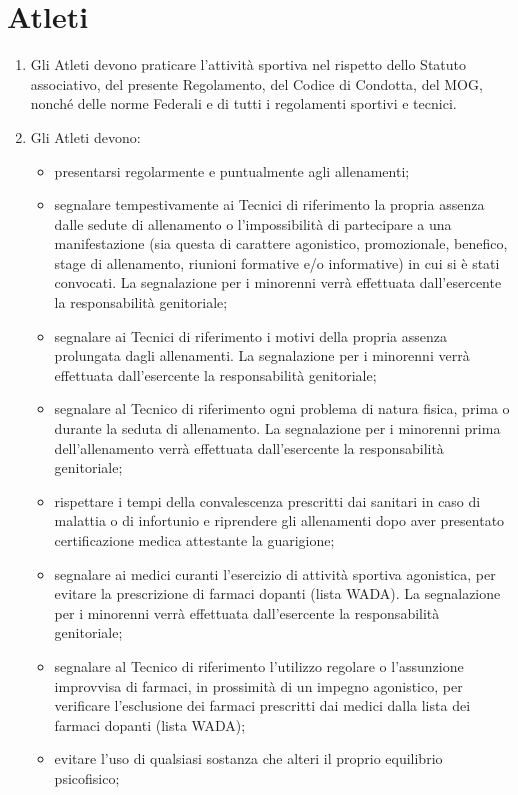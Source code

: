 \documentclass{djtsdoc}
\begin{document}
	\section{Atleti}
	\begin{enumerate}
		\item Gli Atleti devono praticare l'attività sportiva nel rispetto dello Statuto associativo, del presente Regolamento, del Codice di Condotta, del MOG, nonché delle norme Federali e di tutti i regolamenti sportivi e tecnici.
		\item Gli Atleti devono:
		\begin{itemize}
			\item presentarsi regolarmente e puntualmente agli allenamenti;
			\item segnalare tempestivamente ai Tecnici di riferimento la propria assenza dalle sedute di allenamento o l'impossibilità di partecipare a una manifestazione (sia questa di carattere agonistico, promozionale, benefico, stage di allenamento, riunioni formative e/o informative) in cui si è stati convocati. La segnalazione per i minorenni verrà effettuata dall'esercente la responsabilità genitoriale;
			\item segnalare ai Tecnici di riferimento i motivi della propria assenza prolungata dagli allenamenti. La segnalazione per i minorenni verrà effettuata dall'esercente la responsabilità genitoriale;
			\item segnalare al Tecnico di riferimento ogni problema di natura fisica, prima o durante la seduta di allenamento. La segnalazione per i minorenni prima dell'allenamento verrà effettuata dall'esercente la responsabilità genitoriale;
			\item rispettare i tempi della convalescenza prescritti dai sanitari in caso di malattia o di infortunio e riprendere gli allenamenti dopo aver presentato certificazione medica attestante la guarigione;
			\item segnalare ai medici curanti l'esercizio di attività sportiva agonistica, per evitare la prescrizione di farmaci dopanti (lista WADA). La segnalazione per i minorenni verrà effettuata dall'esercente la responsabilità genitoriale;
			\item segnalare al Tecnico di riferimento l'utilizzo regolare o l'assunzione improvvisa di farmaci, in prossimità di un impegno agonistico, per verificare l'esclusione dei farmaci prescritti dai medici dalla lista dei farmaci dopanti (lista WADA);
			\item evitare l'uso di qualsiasi sostanza che alteri il proprio equilibrio psicofisico;

\end{itemize}
\end{enumerate}
\end{document}
